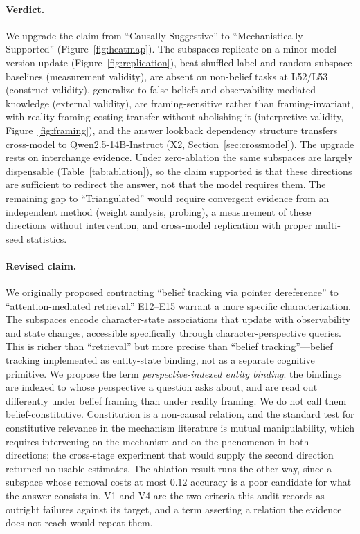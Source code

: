 \documentclass{article}
\begin{document}
\paragraph{Verdict.}
We upgrade the claim from ``Causally Suggestive'' to ``Mechanistically Supported'' (Figure~\ref{fig:heatmap}). The subspaces replicate on a minor model version update (Figure~\ref{fig:replication}), beat shuffled-label and random-subspace baselines (measurement validity), are absent on non-belief tasks at L52/L53 (construct validity), generalize to false beliefs and observability-mediated knowledge (external validity), are framing-sensitive rather than framing-invariant, with reality framing costing transfer without abolishing it (interpretive validity, Figure~\ref{fig:framing}), and the answer lookback dependency structure transfers cross-model to Qwen2.5-14B-Instruct (X2, Section~\ref{sec:crossmodel}). The upgrade rests on interchange evidence. Under zero-ablation the same subspaces are largely dispensable (Table~\ref{tab:ablation}), so the claim supported is that these directions are sufficient to redirect the answer, not that the model requires them. The remaining gap to ``Triangulated'' would require convergent evidence from an independent method (weight analysis, probing), a measurement of these directions without intervention, and cross-model replication with proper multi-seed statistics.

\paragraph{Revised claim.}
We originally proposed contracting ``belief tracking via pointer dereference'' to ``attention-mediated retrieval.'' E12--E15 warrant a more specific characterization. The subspaces encode character-state associations that update with observability and state changes, accessible specifically through character-perspective queries. This is richer than ``retrieval'' but more precise than ``belief tracking''---belief tracking implemented as entity-state binding, not as a separate cognitive primitive. We propose the term \emph{perspective-indexed entity binding}: the bindings are indexed to
whose perspective a question asks about, and are read out differently under belief framing
than under reality framing. We do not call them belief-constitutive. Constitution is a
non-causal relation, and the standard test for constitutive relevance in the mechanism
literature is mutual manipulability, which requires intervening on the mechanism and on the
phenomenon in both directions; the cross-stage experiment that would supply the second
direction returned no usable estimates. The ablation result runs the other way, since a
subspace whose removal costs at most $0.12$ accuracy is a poor candidate for what the answer
consists in. V1 and V4 are the two criteria this audit records as outright failures against
its target, and a term asserting a relation the evidence does not reach would repeat them.
\end{document}
